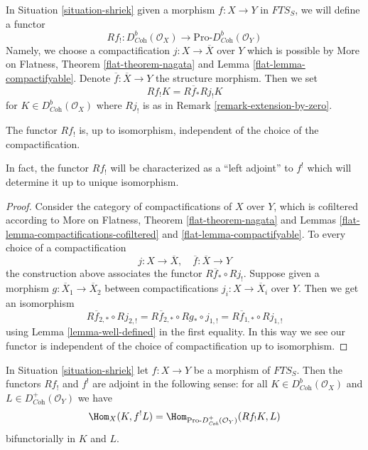 \noindent
In Situation \ref{situation-shriek} given a morphism $f : X \to Y$
in $\textit{FTS}_S$, we will define a functor
$$
Rf_! : D^b_{\textit{Coh}}(\mathcal{O}_X)
\longrightarrow
\text{Pro-}D^b_{\textit{Coh}}(\mathcal{O}_Y)
$$
Namely, we choose a compactification $j : X \to \overline{X}$ over $Y$
which is possible by More on Flatness, Theorem \ref{flat-theorem-nagata} and
Lemma \ref{flat-lemma-compactifyable}. Denote
$\overline{f} : \overline{X} \to Y$ the structure morphism. Then we set
$$
Rf_!K  = R\overline{f}_* Rj_! K
$$
for $K \in D^b_{\textit{Coh}}(\mathcal{O}_X)$ where $Rj_!$ is
as in Remark \ref{remark-extension-by-zero}.

\begin{lemma}
\label{lemma-lower-shriek-well-defined}
The functor $Rf_!$ is, up to isomorphism, independent
of the choice of the compactification.
\end{lemma}

\noindent
In fact, the functor $Rf_!$ will be characterized as a ``left adjoint''
to $f^!$ which will determine it up to unique isomorphism.

\begin{proof}
Consider the category of compactifications of $X$ over $Y$, which is
cofiltered according to More on Flatness, Theorem \ref{flat-theorem-nagata} and
Lemmas \ref{flat-lemma-compactifications-cofiltered} and
\ref{flat-lemma-compactifyable}.
To every choice of a compactification
$$
j : X \to \overline{X},\quad \overline{f} : \overline{X} \to Y
$$
the construction above associates the functor $R\overline{f}_* \circ Rj_!$.
Suppose given a morphism $g : \overline{X}_1 \to \overline{X}_2$
between compactifications $j_i : X \to \overline{X}_i$ over $Y$.
Then we get an isomorphism
$$
R\overline{f}_{2, *} \circ Rj_{2, !} =
R\overline{f}_{2, *} \circ Rg_* \circ j_{1, !} =
R\overline{f}_{1, *} \circ Rj_{1, !}
$$
using Lemma \ref{lemma-well-defined} in the first equality. In this way
we see our functor is independent of the choice of compactification
up to isomorphism.
\end{proof}

\begin{proposition}
\label{proposition-duality-compactly-supported}
In Situation \ref{situation-shriek} let $f : X \to Y$ be a morphism of
$\textit{FTS}_S$. Then the functors $Rf_!$ and $f^!$ are adjoint in
the following sense: for all $K \in D^b_{\textit{Coh}}(\mathcal{O}_X)$
and $L \in D^+_{\textit{Coh}}(\mathcal{O}_Y)$ we have
$$
\Hom_X(K, f^!L) =
\Hom_{\text{Pro-}D^+_{\textit{Coh}}(\mathcal{O}_Y)}(Rf_!K, L)
$$
bifunctorially in $K$ and $L$.
\end{proposition}

